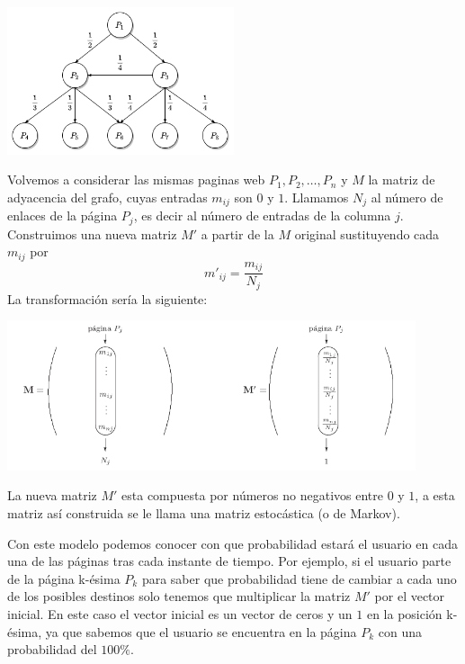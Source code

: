 \documentclass[size=a4, parskip=half, titlepage=false, toc=flat, toc=bib, 12pt]{scrartcl}
\theoremstyle{theorem-style}
\theoremstyle{definition-style}
\theoremstyle{remark-style}
\theoremstyle{example-style}
\theoremstyle{definition-style}
\theoremstyle{remark-style}
\begin{document}
\begin{center}
\includegraphics[width=0.5\textwidth]{./img/grafoprob}
\end{center}

Volvemos a considerar las mismas paginas web $P_1, P_2, \dots, P_n$ y $M$ la matriz de adyacencia del grafo, cuyas entradas $m_{ij}$ son $0$ y $1$. Llamamos $N_j$ al número de enlaces de la página $P_j$,  es decir al número de entradas de la columna $j$. Construimos una nueva matriz $M'$ a partir de la $M$ original sustituyendo cada $m_{ij}$ por
$$m'_{ij} = \frac{m_{ij}}{N_j} $$
La transformación sería la siguiente:

\begin{center}
\includegraphics[width=0.9\textwidth]{./img/markov}
\end{center}

La nueva matriz $M'$ esta compuesta por números no negativos entre $0$ y $1$, a esta matriz así construida se le llama una matriz estocástica (o de Markov).

Con este modelo podemos conocer con que probabilidad estará el usuario en cada una de las páginas tras cada instante de tiempo. Por ejemplo, si el usuario parte de la página k-ésima $P_k$ para saber que probabilidad tiene de cambiar a cada uno de los posibles destinos solo tenemos que multiplicar la matriz $M'$ por el vector inicial. En este caso el vector inicial es un vector de ceros y un $1$ en la posición k-ésima, ya que sabemos que el usuario se encuentra en la página $P_k$ con una probabilidad del $100\%$.
\end{document}
